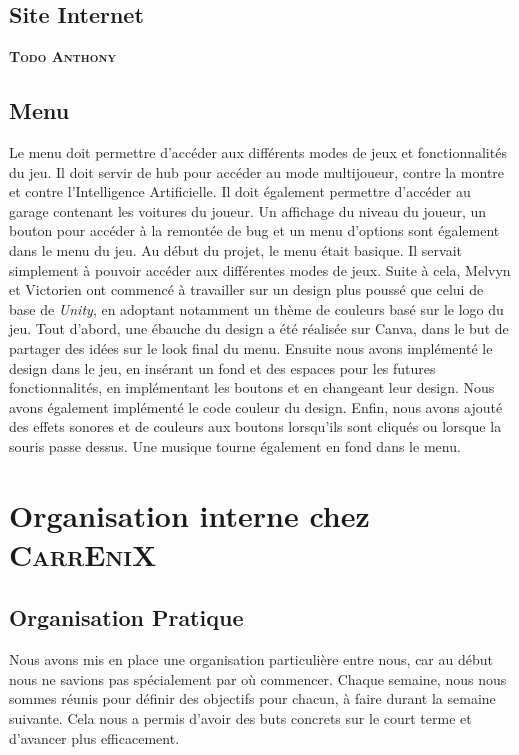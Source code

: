 \documentclass[12pt,a4paper]{article}
\newcommand{\AI}{Intelligence Artificielle}
\newcommand{\CEX}{\textsc{CarrEniX}}
\begin{document}
    \subsection{Site Internet}
        \textbf{\textsc{Todo Anthony}}
  
  
  
    \subsection{Menu}
        Le menu doit permettre d'accéder aux différents modes de jeux et fonctionnalités du jeu.
        Il doit servir de hub pour accéder au mode multijoueur, contre la montre et contre l'\AI.
        Il doit également permettre d'accéder au garage contenant les voitures du joueur. Un affichage
        du niveau du joueur, un bouton pour accéder à la remontée de bug et un menu d'options 
        sont également dans le menu du jeu. Au début du projet, le menu était basique. Il servait 
        simplement à pouvoir accéder aux différentes modes de jeux. Suite à cela, Melvyn et Victorien 
        ont commencé à travailler sur un design plus poussé que celui de base de \textsl{Unity}, 
        en adoptant notamment un thème de couleurs basé sur le logo du jeu. Tout d'abord, une
        ébauche du design a été réalisée sur Canva, dans le but de partager des idées sur le look
        final du menu. Ensuite nous avons implémenté le design dans le jeu, en insérant un fond
        et des espaces pour les futures fonctionnalités, en implémentant les boutons et en changeant
        leur design. Nous avons également implémenté le code couleur du design. Enfin, nous avons 
        ajouté des effets sonores et de couleurs aux boutons lorsqu'ils sont cliqués ou lorsque
        la souris passe dessus. Une musique tourne également en fond dans le menu.

\clearpage

\section{Organisation interne chez \CEX}
    \subsection{Organisation Pratique}
        Nous avons mis en place une organisation particulière entre nous,
        car au début nous ne savions pas spécialement par où commencer.
        Chaque semaine, nous nous sommes réunis pour définir des 
        objectifs pour chacun, à faire durant la semaine suivante. Cela nous 
        a permis d’avoir des buts concrets sur le court terme et d'avancer plus 
        efficacement.
\end{document}
